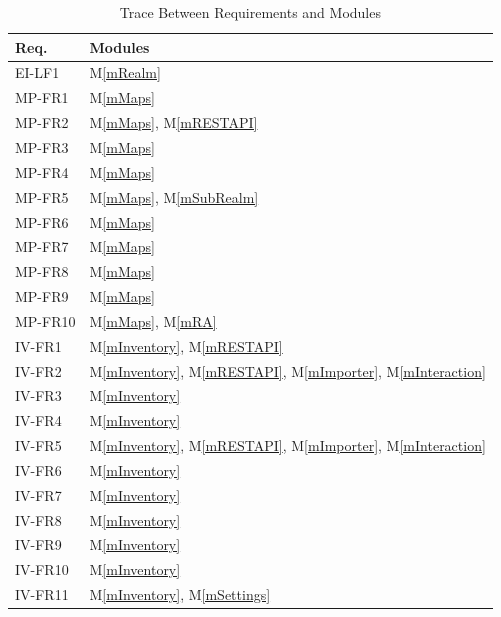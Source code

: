 \documentclass[12pt, titlepage]{article}
\newcommand{\mref}[1]{M\ref{#1}}
\begin{document}
\begin{table}[H]
\centering
\begin{tabular}{p{} p{}}
\toprule
\textbf{Req.} & \textbf{Modules}\\
\midrule
EI-LF1 & \mref{mRealm}\\
MP-FR1 & \mref{mMaps}\\
MP-FR2 & \mref{mMaps}, \mref{mRESTAPI}\\
MP-FR3 & \mref{mMaps}\\
MP-FR4 & \mref{mMaps}\\
MP-FR5 & \mref{mMaps}, \mref{mSubRealm}\\
MP-FR6 & \mref{mMaps}\\
MP-FR7 & \mref{mMaps}\\
MP-FR8 & \mref{mMaps}\\
MP-FR9 & \mref{mMaps}\\
MP-FR10 & \mref{mMaps}, \mref{mRA}\\
IV-FR1 & \mref{mInventory}, \mref{mRESTAPI}\\
IV-FR2 & \mref{mInventory}, \mref{mRESTAPI}, \mref{mImporter}, \mref{mInteraction}\\
IV-FR3 & \mref{mInventory}\\
IV-FR4 & \mref{mInventory}\\
IV-FR5 & \mref{mInventory}, \mref{mRESTAPI}, \mref{mImporter}, \mref{mInteraction}\\
IV-FR6 & \mref{mInventory}\\
IV-FR7 & \mref{mInventory}\\
IV-FR8 & \mref{mInventory}\\
IV-FR9 & \mref{mInventory}\\
IV-FR10 & \mref{mInventory}\\
IV-FR11 & \mref{mInventory}, \mref{mSettings}\\
\bottomrule
\end{tabular}
\caption{Trace Between Requirements and Modules}
\label{TblRT}
\end{table}
\end{document}

